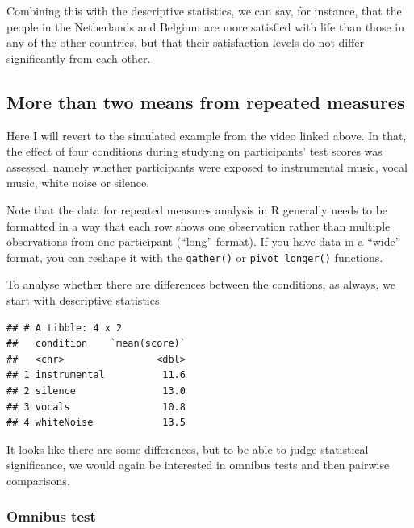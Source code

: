 \documentclass[
]{book}
\newenvironment{Shaded}{\begin{snugshade}}{\end{snugshade}}
\newcommand{\KeywordTok}[1]{\textcolor[rgb]{0.13,0.29,0.53}{\textbf{#1}}}
\newcommand{\NormalTok}[1]{#1}
\newcommand{\OperatorTok}[1]{\textcolor[rgb]{0.81,0.36,0.00}{\textbf{#1}}}
\newcommand{\StringTok}[1]{\textcolor[rgb]{0.31,0.60,0.02}{#1}}
\begin{document}
Combining this with the descriptive statistics, we can say, for instance, that the people in the Netherlands and Belgium are more satisfied with life than those in any of the other countries, but that their satisfaction levels do not differ significantly from each other.

\hypertarget{more-than-two-means-from-repeated-measures}{%
\subsection{More than two means from repeated measures}\label{more-than-two-means-from-repeated-measures}}

Here I will revert to the simulated example from the video linked above. In that, the effect of four conditions during studying on participants' test scores was assessed, namely whether participants were exposed to instrumental music, vocal music, white noise or silence.

Note that the data for repeated measures analysis in R generally needs to be formatted in a way that each row shows one observation rather than multiple observations from one participant (``long'' format). If you have data in a ``wide'' format, you can reshape it with the \texttt{gather()} or \texttt{pivot\_longer()} functions.

To analyse whether there are differences between the conditions, as always, we start with descriptive statistics.

\begin{Shaded}
\end{Shaded}

\begin{verbatim}
## # A tibble: 4 x 2
##   condition    `mean(score)`
##   <chr>                <dbl>
## 1 instrumental          11.6
## 2 silence               13.0
## 3 vocals                10.8
## 4 whiteNoise            13.5
\end{verbatim}

It looks like there are some differences, but to be able to judge statistical significance, we would again be interested in omnibus tests and then pairwise comparisons.

\hypertarget{omnibus-test}{%
\subsubsection{Omnibus test}\label{omnibus-test}}
\end{document}
